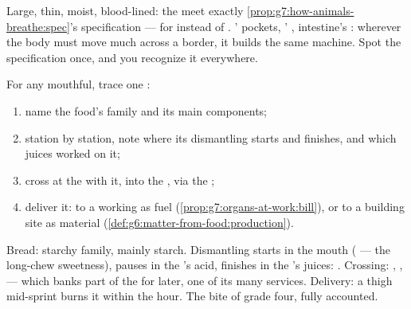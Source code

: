 \begin{example}\label{ex:g7:digestion-and-nutrients:spec}
Large, thin, moist, blood-lined: the  meet exactly
\cref{prop:g7:how-animals-breathe:spec}'s specification ---
for  instead of . ' pockets, '
, intestine's : wherever the body must move
much across a border, it builds the same machine. Spot the
specification once, and you recognize it everywhere.
\end{example}

\begin{method}\label{met:g7:digestion-and-nutrients:trace}
For any mouthful, trace one :
\begin{enumerate}
  \item name the food's family and its main components;
  \item station by station, note where its dismantling
        starts and finishes, and which juices worked on it;
  \item cross at the  with it, into the , via
        the ;
  \item deliver it: to a working  as fuel
        (\cref{prop:g7:organs-at-work:bill}), or to a
        building site as material
        (\cref{def:g6:matter-from-food:production}).
\end{enumerate}
\end{method}

\begin{example}\label{ex:g7:digestion-and-nutrients:breadtrace}
Bread: starchy family, mainly starch. Dismantling starts
in the mouth ( --- the long-chew sweetness),
pauses in the 's acid, finishes in the 's juices: . Crossing: , ,
 --- which banks part of the  for later, one
of its many services. Delivery: a thigh  mid-sprint
burns it within the hour. The bite of grade four, fully
accounted.
\end{example}


